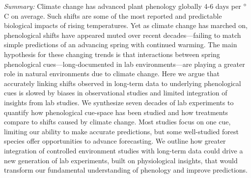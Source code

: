 \documentclass[11pt,letter]{article}
\newcommand{\R}[1]{\label{#1}\linelabel{#1}}
\begin{document}
\newpage
\emph{Summary:} 
Climate change has advanced plant phenology globally 4-6 days per $\degree$C on average. Such shifts are some of the most reported and predictable biological impacts of rising temperatures. Yet as climate change has marched on, phenological shifts have appeared muted over recent decades---failing to match simple predictions of an advancing spring with continued warming. The main hypothesis for these changing trends is that interactions between spring phenological cues---long-documented in lab environments---are playing a greater role in natural environments due to climate change. Here we argue that accurately linking shifts observed in long-term data to underlying phenological cues is slowed by biases in observational studies and limited integration of \R{absinsights} insights from lab studies. We synthesize seven decades of lab experiments to quantify how phenological cue-space has been studied and how treatments compare to shifts caused by climate change. Most studies focus on one cue, limiting our ability to make accurate predictions, but some well-studied forest species offer opportunities to advance forecasting. We outline how greater integration of controlled environment studies with long-term data could drive a new generation of lab experiments, \R{absmolec}built on physiological insights, that would transform our fundamental understanding of phenology and improve predictions. \\ %
\end{document}
